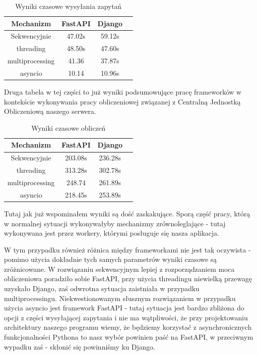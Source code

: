 \begin{table}[ht]
\caption{Wyniki czasowe wysyłania zapytań}
\centering
\begin{tabular}{c c c c}
\hline\hline
Mechanizm & FastAPI & Django \\ [0.5ex]

\hline
Sekwencyjnie & 47.02s & 59.12s \\
threading & 48.50s & 47.60s \\
multiprocessing & 41.36 & 37.87s \\
asyncio & 10.14 & 10.96s \\[1ex]
\hline
\end{tabular}
\end{table}

Druga tabela w tej części to już wyniki podsumowujące pracę frameworków w kontekście wykonywania pracy obliczeniowej związanej z Centralną Jednostką Obliczeniową naszego serwera.
\begin{table}[ht]
\caption{Wyniki czasowe obliczeń}
\centering
\begin{tabular}{c c c c}
\hline\hline
Mechanizm & FastAPI & Django \\ [0.5ex]

\hline
Sekwencyjnie & 203.08s & 236.28s \\
threading & 313.28s & 302.78s \\
multiprocessing & 248.74 & 261.89s \\
asyncio & 218.45s & 253.89s \\[1ex]
\hline
\end{tabular}
\end{table}

Tutaj jak już wspominałem wyniki są dość zaskakujące. Sporą część pracy, którą w normalnej sytuacji wykonywałyby mechanizmy zrównoleglające - tutaj wykonywana jest przez workery, którymi posługuje się nasza aplikacja.

W tym przypadku również różnica między frameworkami nie jest tak oczywista - pomimo użycia dokładnie tych samych parametrów wyniki czasowe są zróżnicowane. W rozwiązaniu sekwencyjnym lepiej z rozporządzaniem moca obliczeniowa poradziło sobie FastAPI, przy użycia threadingu niewielką przewagę uzyskało Django, zaś odwrotna sytuacja zaistniała w przypadku multiprocessingu. Niekwestionowanym słusznym rozwiązaniem w przypadku użycia asyncio jest framework FastAPI - tutaj sytuacja jest bardzo zbliżona do opcji z części wysyłającej zapytania i nie ma wątpliwości, że przy projektowaniu architektury naszego programu wiemy, że będziemy korzystać z asynchronicznych funkcjonalności Pythona to nasz wybór powinien paść na FastAPI, w przeciwnym wypadku zaś - skłonić się powinniśmy ku Django.